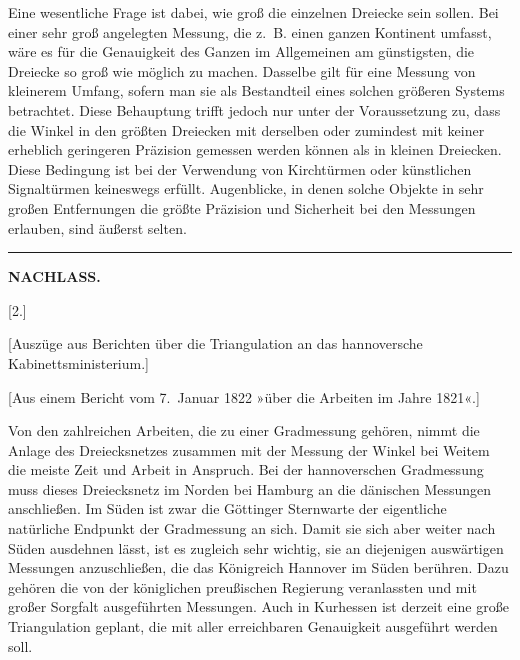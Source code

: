 \par\noindent\hspace*{\parindent}Eine wesentliche Frage ist dabei, wie groß die einzelnen Dreiecke sein
sollen. Bei einer sehr groß angelegten Messung, die z.~B. einen ganzen Kontinent
umfasst, wäre es für die Genauigkeit des Ganzen im Allgemeinen am günstigsten,
die Dreiecke so groß wie möglich zu machen. Dasselbe gilt für eine Messung
von kleinerem Umfang, sofern man sie als Bestandteil eines solchen größeren
Systems betrachtet. Diese Behauptung trifft jedoch nur unter der Voraussetzung
zu, dass die Winkel in den größten Dreiecken mit derselben oder zumindest
mit keiner erheblich geringeren Präzision gemessen werden können als in
kleinen Dreiecken. Diese Bedingung ist bei der Verwendung von Kirchtürmen
oder künstlichen Signaltürmen keineswegs erfüllt. Augenblicke, in denen solche
Objekte in sehr großen Entfernungen die größte Präzision und Sicherheit
bei den Messungen erlauben, sind äußerst selten.

\begin{center}
\rule{.24\linewidth}{.4pt}
\end{center}
\clearpage

\noindent{}\hfill{\small\textbf{NACHLASS.}}\hfill\null\par
\vspace{2\baselineskip}
\begin{center}
[2.]\par\smallskip
{\large [Auszüge aus Berichten über die Triangulation an das hannoversche\\
Kabinettsministerium.]}
\end{center}
\bigskip
\begin{center}
[Aus einem Bericht vom 7.~Januar 1822 »über die Arbeiten im Jahre 1821«.]
\end{center}

\par\noindent\hspace*{\parindent}Von den zahlreichen Arbeiten, die zu einer Gradmessung gehören,
nimmt die Anlage des Dreiecksnetzes zusammen mit der Messung der Winkel
bei Weitem die meiste Zeit und Arbeit in Anspruch. Bei der hannoverschen Gradmessung muss
dieses Dreiecksnetz im Norden bei Hamburg an die dänischen Messungen
anschließen. Im Süden ist zwar die Göttinger Sternwarte der eigentliche
natürliche Endpunkt der Gradmessung an sich. Damit sie sich aber weiter nach
Süden ausdehnen lässt, ist es zugleich sehr wichtig, sie an diejenigen auswärtigen
Messungen anzuschließen, die das Königreich Hannover im Süden berühren.
Dazu gehören die von der königlichen preußischen Regierung veranlassten und
mit großer Sorgfalt ausgeführten Messungen. Auch in Kurhessen ist derzeit
eine große Triangulation geplant, die mit aller erreichbaren Genauigkeit
ausgeführt werden soll.


